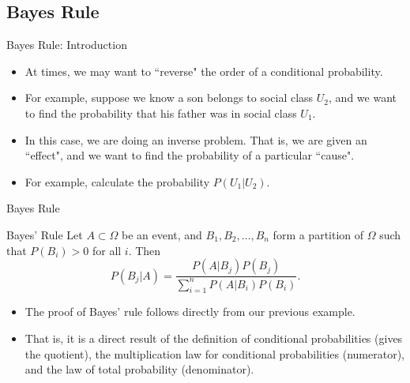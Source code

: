 \subsection{Bayes Rule}

\begin{frame}[allowframebreaks]{Bayes Rule: Introduction}
  \begin{itemize}
    \item At times, we may want to ``reverse" the order of a conditional probability.
    \item For example, suppose we know a son belongs to social class $U_2$, and we want to find the probability that his father was in social class $U_1$.
  
    \item In this case, we are doing an \alert{inverse} problem. That is, we are given an ``effect", and we want to find the probability of a particular ``cause".
    
    \framebreak
    
    \item For example, calculate the probability $P(U_1 | U_2)$.
    

  \end{itemize}
  
\end{frame}

\begin{frame}{Bayes Rule}

  \begin{block}{Bayes' Rule}
    Let $A \subset \Omega$ be an event, and $B_1, B_2, \ldots, B_n$ form a partition of $\Omega$ such that $P(B_i) > 0$ for all $i$. Then
    $$
    P(B_j | A) = \frac{P(A | B_j)P(B_j)}{\sum_{i = 1}^n P(A|B_i)P(B_i)}.
    $$
  \end{block}

  \begin{itemize}
    \item The proof of Bayes' rule follows directly from our previous example.

    \item That is, it is a direct result of the definition of conditional probabilities (gives the quotient), the multiplication law for conditional probabilities (numerator), and the law of total probability (denominator).
  \end{itemize}

\end{frame}
  
